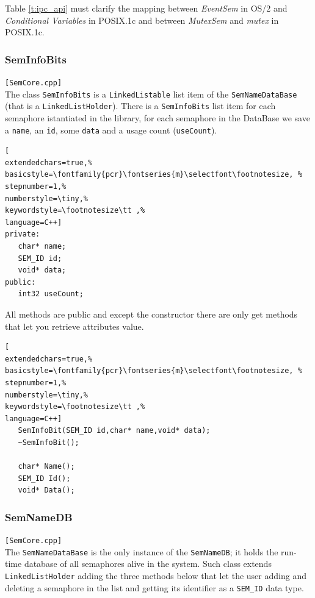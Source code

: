 Table \ref{t:ipc_api} must clarify the mapping between \textit{EventSem} in OS/2 and \textit{Conditional Variables} in POSIX.1c and between \textit{MutexSem} and \textit{mutex} in POSIX.1c.



\subsubsection{SemInfoBits}
\texttt{[SemCore.cpp]}\\
The class \texttt{SemInfoBits} is a \texttt{LinkedListable} list item of the \texttt{SemNameDataBase} (that is a \texttt{LinkedListHolder}). There is a \texttt{SemInfoBits} list item for each semaphore istantiated in the library, for each semaphore in the DataBase we save a \texttt{name}, an \texttt{id}, some \texttt{data} and a usage count (\texttt{useCount}).

\begin{lstlisting}[
extendedchars=true,%
basicstyle=\fontfamily{pcr}\fontseries{m}\selectfont\footnotesize, %
stepnumber=1,%
numberstyle=\tiny,%
keywordstyle=\footnotesize\tt ,%
language=C++]
private:
   char* name;
   SEM_ID id;
   void* data;
public:
   int32 useCount;
\end{lstlisting}

All methods are public and except the constructor there are only get methods that let you retrieve attributes value.

\begin{lstlisting}[
extendedchars=true,%
basicstyle=\fontfamily{pcr}\fontseries{m}\selectfont\footnotesize, %
stepnumber=1,%
numberstyle=\tiny,%
keywordstyle=\footnotesize\tt ,%
language=C++]
   SemInfoBit(SEM_ID id,char* name,void* data);
   ~SemInfoBit();

   char* Name();
   SEM_ID Id();
   void* Data();
\end{lstlisting}



\subsubsection{SemNameDB}
\texttt{[SemCore.cpp]}\\
The \texttt{SemNameDataBase} is the only instance of the \texttt{SemNameDB}; it holds the run-time database of all semaphores alive in the system.
Such class extends \texttt{LinkedListHolder} adding the three methods below that let the user adding and deleting a semaphore in the list and getting its identifier as a \texttt{SEM\_ID} data type.

